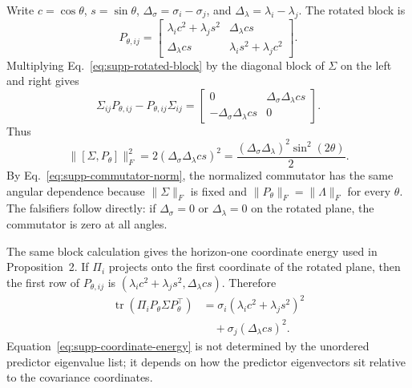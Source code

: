 \documentclass{article}
\DeclareMathOperator{\tr}{tr}
\newcommand{\comm}[2]{[#1,#2]}
\begin{document}
Write $c=\cos\theta$, $s=\sin\theta$, $\Delta_\sigma=\sigma_i-\sigma_j$, and $\Delta_\lambda=\lambda_i-\lambda_j$. The rotated block is
\begin{equation}
P_{\theta,ij}=
\begin{bmatrix}
\lambda_i c^2+\lambda_j s^2 & \Delta_\lambda cs\\
\Delta_\lambda cs & \lambda_i s^2+\lambda_j c^2
\end{bmatrix}.
\label{eq:supp-rotated-block}
\end{equation}
Multiplying Eq.~\eqref{eq:supp-rotated-block} by the diagonal block of $\Sigma$ on the left and right gives
\begin{equation}
\Sigma_{ij}P_{\theta,ij}-P_{\theta,ij}\Sigma_{ij}=
\begin{bmatrix}
0 & \Delta_\sigma\Delta_\lambda cs\\
-\Delta_\sigma\Delta_\lambda cs & 0
\end{bmatrix}.
\label{eq:supp-commutator-block}
\end{equation}
Thus
\begin{equation}
\|\comm{\Sigma}{P_\theta}\|_F^2
=2(\Delta_\sigma\Delta_\lambda cs)^2
=\frac{(\Delta_\sigma\Delta_\lambda)^2\sin^2(2\theta)}{2}.
\label{eq:supp-commutator-norm}
\end{equation}
By Eq.~\eqref{eq:supp-commutator-norm}, the normalized commutator has the same angular dependence because $\|\Sigma\|_F$ is fixed and $\|P_\theta\|_F=\|\Lambda\|_F$ for every $\theta$. The falsifiers follow directly: if $\Delta_\sigma=0$ or $\Delta_\lambda=0$ on the rotated plane, the commutator is zero at all angles.

The same block calculation gives the horizon-one coordinate energy used in Proposition~2. If $\Pi_i$ projects onto the first coordinate of the rotated plane, then the first row of $P_{\theta,ij}$ is $(\lambda_i c^2+\lambda_j s^2,\Delta_\lambda cs)$. Therefore
\begin{equation}
\begin{aligned}
\tr(\Pi_i P_\theta\Sigma P_\theta^\top)
&=
\sigma_i(\lambda_i c^2+\lambda_j s^2)^2\\
&\quad+
\sigma_j(\Delta_\lambda cs)^2.
\end{aligned}
\label{eq:supp-coordinate-energy}
\end{equation}
Equation~\eqref{eq:supp-coordinate-energy} is not determined by the unordered predictor eigenvalue list; it depends on how the predictor eigenvectors sit relative to the covariance coordinates.
\end{document}
